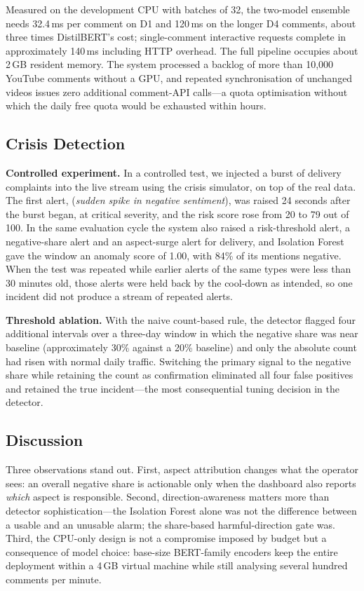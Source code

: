 \documentclass[conference]{IEEEtran}
\begin{document}
Measured on the development CPU with batches of 32, the two-model ensemble needs
32.4\,ms per comment on D1 and 120\,ms on the longer D4 comments, about three times
DistilBERT's cost; single-comment interactive requests complete in approximately
140\,ms including HTTP overhead. The full pipeline occupies about
2\,GB resident memory. The system processed a backlog of more than
10{,}000 YouTube comments without a GPU, and repeated synchronisation of unchanged videos issues
zero additional comment-API calls---a quota optimisation without which the daily free
quota would be exhausted within hours.

\subsection{Crisis Detection}
\label{sec:crisis}

\textbf{Controlled experiment.} In a controlled test, we injected a burst of delivery complaints into the live stream using the crisis simulator, on top of the real data. The first alert, (\emph{sudden spike in negative sentiment}), was raised 24 seconds after the burst began, at critical severity, and the risk score rose from 20 to 79 out of 100. In the same evaluation cycle the system also raised a risk-threshold alert, a negative-share alert and an aspect-surge alert for delivery, and Isolation Forest gave the window an anomaly score of 1.00, with 84\% of its mentions negative. When the test was repeated while earlier alerts of the same types were less than 30 minutes old, those alerts were held back by the cool-down as intended, so one incident did not produce a stream of repeated alerts.

\textbf{Threshold ablation.} With the naive count-based rule, the detector flagged four
additional intervals over a three-day window in which the negative share was near
baseline (approximately 30\% against a 20\% baseline) and only the absolute count had
risen with normal daily traffic. Switching the primary signal to the negative share while
retaining the count as confirmation eliminated all four false positives and retained the
true incident---the most consequential tuning decision in the detector.

\subsection{Discussion}

Three observations stand out. First, aspect attribution changes what the operator sees: an
overall negative share is actionable only when the dashboard also reports \emph{which}
aspect is responsible. Second, direction-awareness matters more than detector
sophistication---the Isolation Forest alone was not the difference between a usable and an
unusable alarm; the share-based harmful-direction gate was. Third, the CPU-only design is
not a compromise imposed by budget but a consequence of model choice: base-size BERT-family
encoders keep the entire deployment within a 4\,GB virtual machine while still analysing
several hundred comments per minute.
\end{document}
